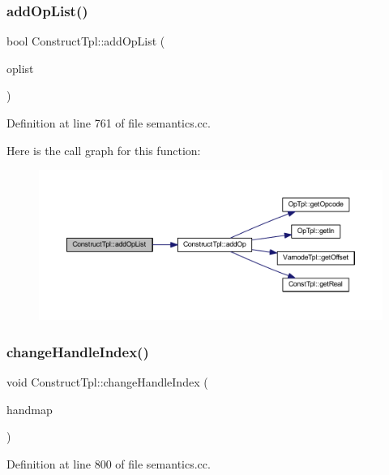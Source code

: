 \subsubsection{\texorpdfstring{addOpList()}{addOpList()}}
{\footnotesize\ttfamily bool Construct\+Tpl\+::add\+Op\+List (\begin{DoxyParamCaption}\item[{const vector$<$ \mbox{\hyperlink{class_op_tpl}{Op\+Tpl}} $\ast$ $>$ \&}]{oplist }\end{DoxyParamCaption})}



Definition at line 761 of file semantics.\+cc.

Here is the call graph for this function\+:
\nopagebreak
\begin{figure}[H]
\begin{center}
\leavevmode
\includegraphics[width=350pt]{class_construct_tpl_a1744c9bd849faf17b5a68519fcaa58eb_cgraph}
\end{center}
\end{figure}
\mbox{\label{class_construct_tpl_a6748ce8632e758aabf9b0d5a252fad5f}} 
\subsubsection{\texorpdfstring{changeHandleIndex()}{changeHandleIndex()}}
{\footnotesize\ttfamily void Construct\+Tpl\+::change\+Handle\+Index (\begin{DoxyParamCaption}\item[{const vector$<$ int4 $>$ \&}]{handmap }\end{DoxyParamCaption})}



Definition at line 800 of file semantics.\+cc.

